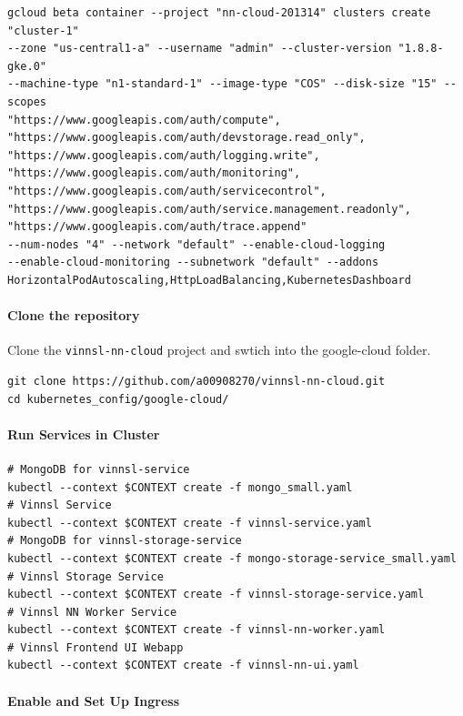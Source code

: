 \begin{verbatim}
gcloud beta container --project "nn-cloud-201314" clusters create "cluster-1" 
--zone "us-central1-a" --username "admin" --cluster-version "1.8.8-gke.0" 
--machine-type "n1-standard-1" --image-type "COS" --disk-size "15" --scopes 
"https://www.googleapis.com/auth/compute",
"https://www.googleapis.com/auth/devstorage.read_only",
"https://www.googleapis.com/auth/logging.write",
"https://www.googleapis.com/auth/monitoring",
"https://www.googleapis.com/auth/servicecontrol",
"https://www.googleapis.com/auth/service.management.readonly",
"https://www.googleapis.com/auth/trace.append" 
--num-nodes "4" --network "default" --enable-cloud-logging 
--enable-cloud-monitoring --subnetwork "default" --addons 
HorizontalPodAutoscaling,HttpLoadBalancing,KubernetesDashboard
\end{verbatim}

\paragraph{Clone the repository}\label{clone-the-repository}

Clone the \texttt{vinnsl-nn-cloud} project and swtich into the
google-cloud folder.

\begin{verbatim}
git clone https://github.com/a00908270/vinnsl-nn-cloud.git
cd kubernetes_config/google-cloud/
\end{verbatim}

\paragraph{Run Services in Cluster}\label{run-services-in-cluster-1}

\begin{verbatim}
# MongoDB for vinnsl-service
kubectl --context $CONTEXT create -f mongo_small.yaml 
# Vinnsl Service
kubectl --context $CONTEXT create -f vinnsl-service.yaml
# MongoDB for vinnsl-storage-service
kubectl --context $CONTEXT create -f mongo-storage-service_small.yaml
# Vinnsl Storage Service
kubectl --context $CONTEXT create -f vinnsl-storage-service.yaml
# Vinnsl NN Worker Service
kubectl --context $CONTEXT create -f vinnsl-nn-worker.yaml
# Vinnsl Frontend UI Webapp
kubectl --context $CONTEXT create -f vinnsl-nn-ui.yaml
\end{verbatim}

\paragraph{Enable and Set Up Ingress}\label{enable-and-set-up-ingress-1}

